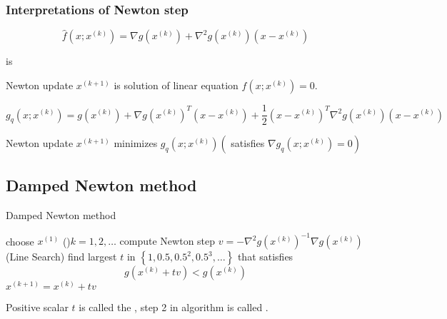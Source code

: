 \subsubsection{Interpretations of Newton step}


\begin{definition}[affine approximation of $ f(x)=\nabla g(x) $ around $ x^{(k)} $]
    \begin{equation}
\hat{f}\left(x ; x^{(k)}\right)=\nabla g\left(x^{(k)}\right)+\nabla^{2} g\left(x^{(k)}\right)\left(x-x^{(k)}\right)
\end{equation}
\end{definition} is

Newton update $ x^{(k+1)} $ is solution of linear equation $ \hat{f}\left(x ; x^{(k)}\right)=0 $.

\begin{definition}
    \begin{equation}
g_{{q}}\left(x ; x^{(k)}\right)=g\left(x^{(k)}\right)+\nabla g\left(x^{(k)}\right)^{T}\left(x-x^{(k)}\right)+\frac{1}{2}\left(x-x^{(k)}\right)^{T} \nabla^{2} g\left(x^{(k)}\right)\left(x-x^{(k)}\right)
\end{equation}
\end{definition}

Newton update $ x^{(k+1)} $ minimizes $ g_{{q}}\left(x ; x^{(k)}\right)\left(\right. $ satisfies $ \left.\nabla g_{{q}}\left(x ; x^{(k)}\right)=0\right) $


\subsection{Damped Newton method}

\begin{algorithm}
    \caption{Damped Newton method}
    choose $ x^{(1)} $\;
    \While(){$ k=1,2, \ldots $}{
        compute Newton step $ v=-\nabla^{2} g\left(x^{(k)}\right)^{-1} \nabla g\left(x^{(k)}\right) $\;
        (Line Search) find largest $ t $ in $ \left\{1,0.5,0.5^{2}, 0.5^{3}, \ldots\right\} $ that satisfies
        \begin{equation}
        g\left(x^{(k)}+t v\right)<g\left(x^{(k)}\right)
        \end{equation}\;
        $ x^{(k+1)}=x^{(k)}+t v $\;
    }
\end{algorithm}

Positive scalar $ t $ is called the , step 2 in algorithm is called .


